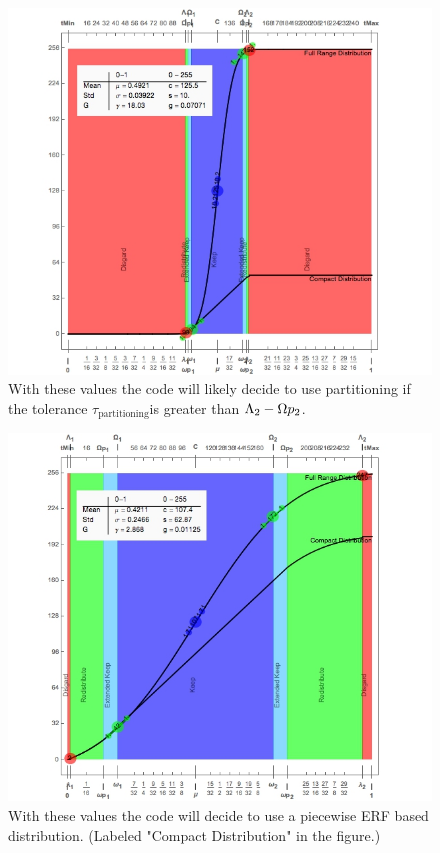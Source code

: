 \begin{figure}[h]
\centering
\includegraphics[width=1\linewidth]{Chapter2/Figs/usePartitioning}
\caption{With these values the code will likely decide to use partitioning if the tolerance $\tau_{\text{partitioning}}$is greater than $\Lambda_2-\Omega p_2$.}
\label{fig:usePartitioning}
\end{figure}

\begin{figure}[h]
\centering
\includegraphics[width=1\linewidth]{Chapter2/Figs/usePiecewiseERF}
\caption{With these values the code will decide to use a piecewise ERF based distribution. (Labeled "Compact Distribution" in the figure.)}
\label{fig:usePiecewiseERF}
\end{figure}


